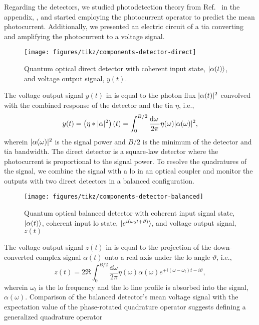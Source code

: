 Regarding the detectors, we studied photodetection theory from Ref.~\cite{Mandel1995,Kimble1984,Vogel2006} in the appendix, , and started employing the photocurrent operator to predict the mean photocurrent.
Additionally, we presented an electric circuit of a \gls{tia} converting and amplifying the photocurrent to a voltage signal.
\begin{figure}[htb]
    \centering
    \texttt{[image: figures/tikz/components-detector-direct]}
    \caption{Quantum optical direct detector with coherent input state, $\lvert\alpha(t)\rangle$, and voltage output signal, $y(t)$.}\label{fig:components_detector_direct}
\end{figure}
The voltage output signal $y(t)$ in  is equal to the photon flux $\lvert\alpha(t)\rvert^2$ convolved with the combined response of the detector and the \gls{tia} $\eta$, i.e.,
\begin{equation}
	y(t)
	=
	\left(\eta\conv\abs{\alpha}^2\right)(t)
	=
	\int_0^{B/2}\frac{\dd{\omega}}{2\pi}
	\eta(\omega)
	\abs{\alpha(\omega)}^2
	,
\end{equation}
wherein $\lvert\alpha(\omega)\rvert^2$ is the signal power and $B/2$ is the minimum of the detector and \gls{tia} bandwidth.
The direct detector is a square-law detector where the photocurrent is proportional to the signal power.
To resolve the quadratures of the signal, we combine the signal with a \gls{lo} in an optical coupler and monitor the outputs with two direct detectors in a balanced configuration.
\begin{figure}[htb]
    \centering
    \texttt{[image: figures/tikz/components-detector-balanced]}
    \caption{Quantum optical balanced detector with coherent input signal state, $\lvert\alpha(t)\rangle$, coherent input \gls{lo} state, $\lvert e^{i(\omega_0t+\vartheta)}\rangle$, and voltage output signal, $z(t)$}\label{fig:components_detector_balanced}
\end{figure}
The voltage output signal $z(t)$ in  is equal to the projection of the down-converted complex signal $\alpha(t)$ onto a real axis under the \gls{lo} angle $\vartheta$, i.e.,
\begin{equation}
	z(t)
	=
	2\Re
	\int_0^{B/2}\frac{\dd{\omega}}{2\pi}
	\eta(\omega)
	\alpha(\omega)
	e^{+i(\omega-\omega_l)t-i\vartheta}
	,
\end{equation}
wherein $\omega_l$ is the \gls{lo} frequency and the \gls{lo} line profile is absorbed into the signal, $\alpha(\omega)$.
Comparison of the balanced detector's mean voltage signal with the expectation value of the phase-rotated quadrature operator suggests defining a generalized quadrature operator
